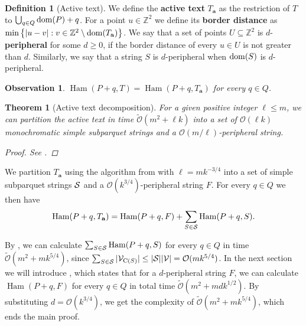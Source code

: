 \documentclass[11pt]{article}
\newcommand{\Z}{\mathbb{Z}}
\renewcommand{\O}{\mathcal{O}}
\newcommand{\tO}{\tilde{\mathcal{O}}}
\newcommand{\set}[1]{\left\lbrace #1 \right\rbrace}
\theoremstyle{plain}
\newtheorem{theorem}{Theorem}
\newtheorem{observation}{Observation}
\theoremstyle{definition}
\newtheorem{definition}{Definition}
\theoremstyle{remark}
\DeclareMathOperator*{\Ham}{Ham}
\begin{document}
\newcommand{\Ta}{T_\mathbf{a}}
\begin{definition}[Active text]
	We define the \textbf{active text} $\Ta$ as the restriction of $T$ to $\bigcup_{q \in Q} \d{P} + q$.
	For a point $u \in \Z^2$ we define its \textbf{border distance} as
	$\min\set{|u - v| : v \in \Z^2 \setminus \d{\Ta}} $.
	We say that a set of points $U \subseteq \Z^2$ is $d$-\textbf{peripheral} for some $d \ge 0$, if the border distance of every $u \in U$ is not greater than $d$.
	Similarly, we say that a string $S$ is $d$-peripheral when $\d{S}$ is $d$-peripheral.
\end{definition}


\begin{observation}
	$\Ham(P + q, T) = \Ham(P + q, \Ta)$ for every $q \in Q$.
\end{observation}


\begin{theorem}[Active text decomposition]\label{text_decomposition}
	For a given positive integer $\ell \le m$, we can partition the active text in time $\tO(m^2 + \ell k)$ into a set of $\O(\ell k)$ monochromatic simple subparquet strings
	and a $\O(m / \ell)$-peripheral string.
	\begin{proof} See . \end{proof}
\end{theorem}


We partition $\Ta$ using the algorithm from  with $\ell = mk^{-3/4}$ into a set of simple subparquet strings $\S$ and a $\O(k^{3 / 4})$-peripheral string $F$.
For every $q \in Q$ we then have
\[ \Ham(P + q, \Ta) = \Ham(P + q, F) + \sum_{S \in \S} \Ham(P + q, S).\]

By , we can calculate $\sum_{S \in \S} \Ham(P + q, S)$ for every $q \in Q$ in time $\tO(m^2 + mk^{5/4})$,
since $\sum_{S \in \S} |\V_{\getchar{S}}| \le |\S| |\V| = \O(mk^{5/4})$.
In the next section we will introduce , which states that for a $d$-peripheral string $F$, we can calculate $\Ham(P + q, F)$ for every $q \in Q$ in total time $\tO(m^2 + mdk^{1/2})$.
By substituting $d = \O(k^{3/4})$, we get the complexity of $\tO(m^2 + mk^{5/4})$, which ends the main proof.


\end{document}
